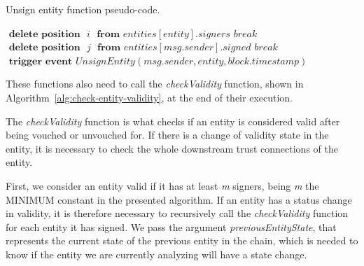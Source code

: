 \begin{algorithm}[h!]
  \caption{Unsign entity function pseudo-code.}
  \label{alg:unsign-entity}
  \begin{algorithmic}[1]
          \State $\textbf{ delete position } \textit{ i } \textbf{ from } entities[entity].signers$
          \State $break$
        \EndIf
      \EndFor
      \State
          \State $\textbf{ delete position } \textit{ j }\textbf{ from } entities[msg.sender].signed$
          \State $break$
        \EndIf
      \EndFor
      \State
      \State $\textbf{ trigger event } UnsignEntity(msg.sender, entity, block.timestamp)$
      \State
      \State {}
    \EndFunction
  \end{algorithmic}
\end{algorithm}

These functions also need to call the \textit{checkValidity} function, shown in Algorithm~\ref{alg:check-entity-validity}, at the end of their execution.

The \textit{checkValidity} function is what checks if an entity is considered valid after being vouched or unvouched for.
If there is a change of validity state in the entity, it is necessary to check the whole downstream trust connections of the entity.

First, we consider an entity valid if it has at least \textit{m} signers, being \textit{m} the MINIMUM constant in the presented algorithm.
If an entity has a status change in validity, it is therefore necessary to recursively call the \textit{checkValidity} function for each entity it has signed.
We pass the argument \textit{previousEntityState}, that represents the current state of the previous entity in the chain, which is needed to know if the entity we are currently analyzing will have a state change.

